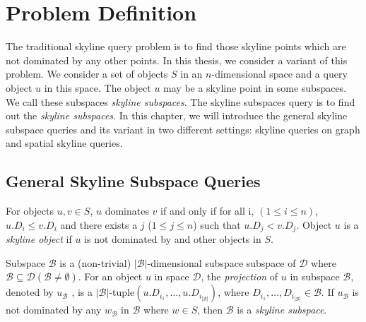 
%
%

\chapter{Problem Definition}
\label{ch:prob-def}

The traditional skyline query problem is to find those skyline points which are not dominated by any other points. In this thesis, we consider a variant of this problem. We consider a set of objects $S$ in an $n$-dimensional space and a query object $u$ in this space. The object $u$ may be a skyline point in some subspaces. We call these subspaces \emph{skyline subspaces}. The skyline subspaces query is to find out the \emph{skyline subspaces}. In this chapter, we will introduce the general skyline subspace queries and its variant in two different settings: skyline queries on graph and spatial skyline queries.

\section{General Skyline Subspace Queries}

\begin{definition}[Skyline]
For objects $u, v \in S$, $u$ dominates $v$ if and only if for all i, $(1 \leq i \leq n)$, $u.D_i \leq v.D_i$ and there exists a $j$ ($1 \leq j \leq n$) such that $u.D_j < v.D_j$. Object $u$ is a \emph{skyline object} if $u$ is not dominated by and other objects in $S$.
\end{definition}

\begin{definition}
Subspace $\mathcal{B}$ is a (non-trivial) $|\mathcal{B}|$-dimensional subspace subspace of $\mathcal{D}$ 
where $\mathcal{B}\subseteq \mathcal{D} (\mathcal{B}\neq\emptyset)$.
For an object $u$ in space $\mathcal{D}$, 
the \emph{projection} of $u$ in subspace $\mathcal{B}$, denoted by $u_\mathcal{B}$
, is a $|\mathcal{B}|$-tuple$(u.D_{i_1},\dots,u.D_{i_{|\mathcal{B}|}})$,
where $D_{i_1},\dots,D_{i_{|\mathcal{B}|}} \in \mathcal{B}$.
If $u_\mathcal{B}$ is not dominated by any $w_\mathcal{B}$ in $\mathcal{B}$ where $w \in S$, then $\mathcal{B}$ is a \emph{skyline subspace}.
\end{definition}

